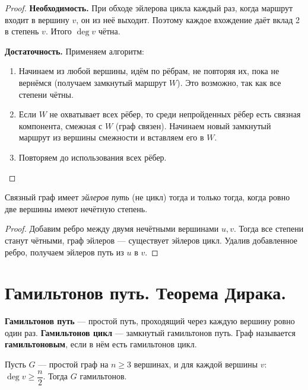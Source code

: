\documentclass[12pt]{article}
\begin{document}
\begin{proof}
\textbf{Необходимость.} При обходе эйлерова цикла каждый
раз, когда маршрут входит в вершину $v$, он из неё выходит.
Поэтому каждое вхождение даёт вклад 2 в степень $v$. Итого $\deg v$ чётна.

\textbf{Достаточность.} Применяем алгоритм:
\begin{enumerate}
\item Начинаем из любой вершины, идём по рёбрам, не повторяя их,
      пока не вернёмся (получаем замкнутый маршрут $W$).
      Это возможно, так как все степени чётны.
\item Если $W$ не охватывает всех рёбер, то среди непройденных рёбер
      есть связная компонента, смежная с $W$ (граф связен).
      Начинаем новый замкнутый маршрут из вершины смежности и вставляем
      его в $W$.
\item Повторяем до использования всех рёбер.
\end{enumerate}
\end{proof}

\begin{theorem}
Связный граф имеет \emph{эйлеров путь} (не цикл) тогда и только тогда,
когда ровно две вершины имеют нечётную степень.
\end{theorem}

\begin{proof}
Добавим ребро между двумя нечётными вершинами $u, v$. Тогда
все степени станут чётными, граф эйлеров --- существует эйлеров цикл.
Удалив добавленное ребро, получаем эйлеров путь из $u$ в $v$.
\end{proof}

\section{Гамильтонов путь. Теорема Дирака.}\label{sec:dirac}

\begin{definition}
\textbf{Гамильтонов путь} --- простой путь, проходящий через
каждую вершину ровно один раз.
\textbf{Гамильтонов цикл} --- замкнутый гамильтонов путь.
Граф называется \textbf{гамильтоновым}, если в нём есть гамильтонов цикл.
\end{definition}

\begin{theorem}\label{thm:dirac}
Пусть $G$ --- простой граф на $n \geq 3$ вершинах, и для каждой
вершины $v$: $\deg v \geq \dfrac{n}{2}$. Тогда $G$ гамильтонов.
\end{theorem}
\end{document}
